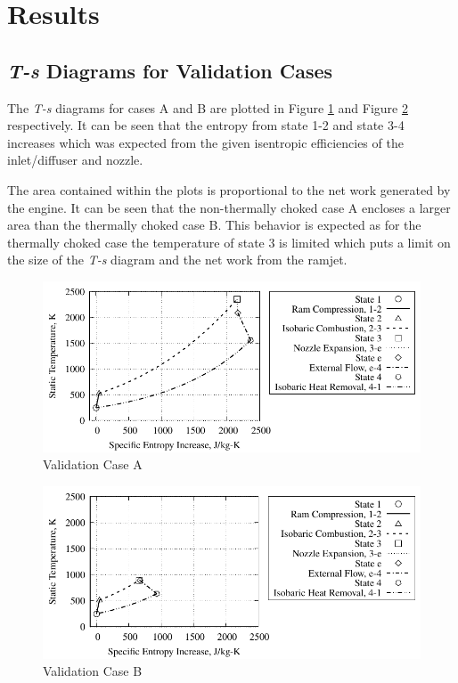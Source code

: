 \documentclass[conf]{new-aiaa} %
\begin{document}
\section{Results} \label{sec:results}
\subsection{\textit{T-s} Diagrams for Validation Cases} %
The \textit{T-s} diagrams for cases A and B are plotted in Figure \ref{fig:partavalida} and Figure \ref{fig:partavalidb} respectively. It can be seen that the entropy from state 1-2 and state 3-4 increases which was expected from the given isentropic efficiencies of the inlet/diffuser and nozzle.

The area contained within the plots is proportional to the net work generated by the engine. It can be seen that the non-thermally choked case A encloses a larger area than the thermally choked case B. This behavior is expected as for the thermally choked case the temperature of state 3 is limited which puts a limit on the size of the \textit{T-s} diagram and the net work from the ramjet.

\begin{figure}[H] %
    \centering
    \includegraphics[]{media/ts_plot_files/TS_plot_for_case_7.pdf}
    \caption{\label{fig:partavalida}Validation Case A}
\end{figure}

\begin{figure}[H] %
    \centering
    \includegraphics[]{media/ts_plot_files/TS_plot_for_case_8.pdf}
    \caption{\label{fig:partavalidb}Validation Case B}
\end{figure}
\end{document}
